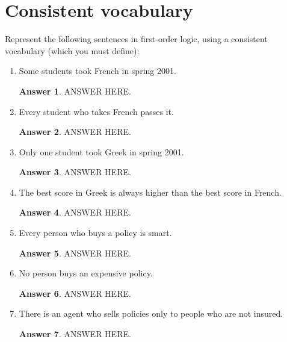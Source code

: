 \documentclass[a4paper]{article}
\renewcommand{\(}{\left(}
\renewcommand{\)}{\right)}
\theoremstyle{plain}
\theoremstyle{plain}
\theoremstyle{definition}
\newtheorem*{answer}{Answer}
\begin{document}
\section{Consistent vocabulary}
Represent the following sentences in first-order logic, using a consistent vocabulary (which you must define):
\begin{enumerate}[label*=\alph*.,ref=\alph*]
\item Some students took French in spring 2001.
\begin{shaded}
\begin{answer}
ANSWER HERE.
\end{answer}
\end{shaded}

\item Every student who takes French passes it.
\begin{shaded}
\begin{answer}
ANSWER HERE.
\end{answer}
\end{shaded}

\item Only one student took Greek in spring 2001.
\begin{shaded}
\begin{answer}
ANSWER HERE.
\end{answer}
\end{shaded}

\item The best score in Greek is always higher than the best score in French.
\begin{shaded}
\begin{answer}
ANSWER HERE.
\end{answer}
\end{shaded}

\item Every person who buys a policy is smart.
\begin{shaded}
\begin{answer}
ANSWER HERE.
\end{answer}
\end{shaded}

\item No person buys an expensive policy.
\begin{shaded}
\begin{answer}
ANSWER HERE.
\end{answer}
\end{shaded}

\item There is an agent who sells policies only to people who are not insured.
\begin{shaded}
\begin{answer}
ANSWER HERE.
\end{answer}
\end{shaded}


\end{enumerate}
\end{document}
